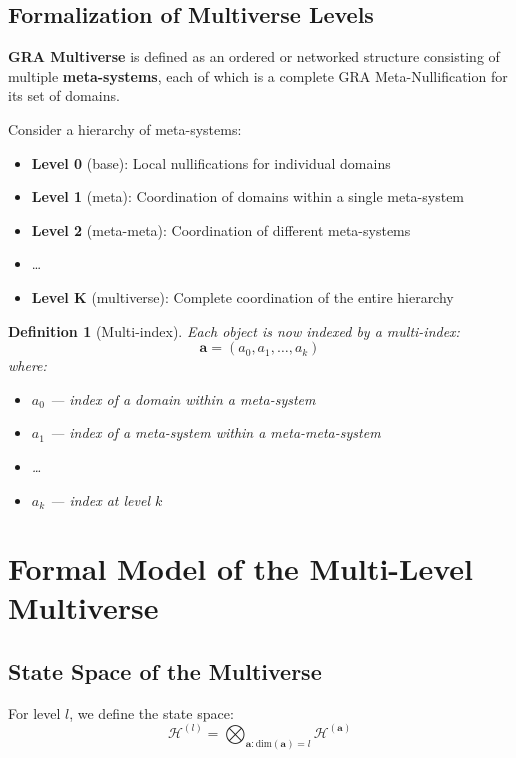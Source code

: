 \documentclass[12pt,a4paper]{article}
\newtheorem{definition}[theorem]{Definition}
\newcommand{\calH}{\mathcal{H}}
\newcommand{\bfa}{\mathbf{a}}
\begin{document}
\subsection{Formalization of Multiverse Levels}

\textbf{GRA Multiverse} is defined as an ordered or networked structure consisting of multiple \textbf{meta-systems}, each of which is a complete GRA Meta-Nullification for its set of domains.

Consider a hierarchy of meta-systems:
\begin{itemize}
    \item \textbf{Level 0} (base): Local nullifications for individual domains
    \item \textbf{Level 1} (meta): Coordination of domains within a single meta-system
    \item \textbf{Level 2} (meta-meta): Coordination of different meta-systems
    \item \ldots
    \item \textbf{Level K} (multiverse): Complete coordination of the entire hierarchy
\end{itemize}

\begin{definition}[Multi-index]
Each object is now indexed by a multi-index:
\begin{equation}
\bfa = (a_0, a_1, \dots, a_k)
\end{equation}
where:
\begin{itemize}
    \item $a_0$ --- index of a domain within a meta-system
    \item $a_1$ --- index of a meta-system within a meta-meta-system
    \item \ldots
    \item $a_k$ --- index at level $k$
\end{itemize}
\end{definition}

\section{Formal Model of the Multi-Level Multiverse}

\subsection{State Space of the Multiverse}

For level $l$, we define the state space:
\begin{equation}
\calH^{(l)} = \bigotimes_{\bfa: \text{dim}(\bfa)=l} \calH^{(\bfa)}
\end{equation}
\end{document}
